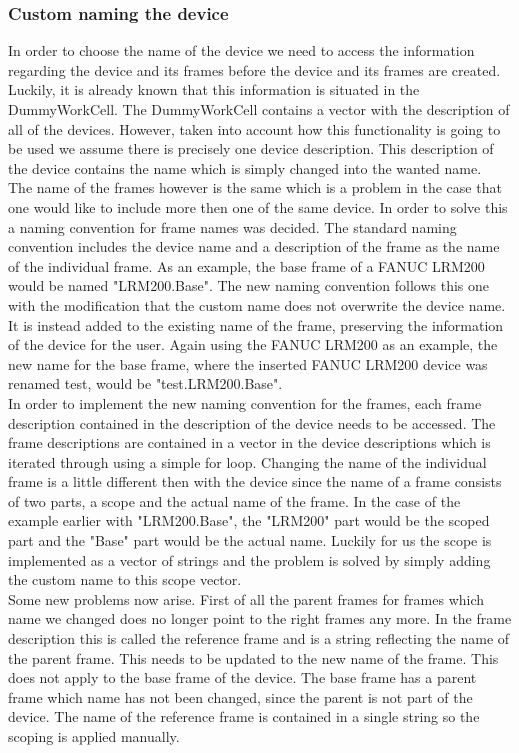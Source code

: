 \subsubsection{Custom naming the device}
In order to choose the name of the device we need to access the information regarding the device and its frames before the device and its frames are created. Luckily, it is already known that this information is situated in the DummyWorkCell. The DummyWorkCell contains a vector with the description of all of the devices. However, taken into account how this functionality is going to be used we assume there is precisely one device description. This description of the device contains the name which is simply changed into the wanted name.\\

The name of the frames however is the same which is a problem in the case that one would like to include more then one of the same device. In order to solve this a naming convention for frame names was decided. The standard naming convention includes the device name and a description of the frame as the name of the individual frame. As an example, the base frame of a FANUC LRM200 would be named "LRM200.Base". The new naming convention follows this one with the modification that the custom name does not overwrite the device name. It is instead added to the existing name of the frame, preserving the information of the device for the user. Again using the FANUC LRM200 as an example, the new name for the base frame, where the inserted FANUC LRM200 device was renamed test, would be "test.LRM200.Base".\\

In order to implement the new naming convention for the frames, each frame description contained in the description of the device needs to be accessed. The frame descriptions are contained in a vector in the device descriptions which is iterated through using a simple for loop. Changing the name of the individual frame is a little different then with the device since the name of a frame consists of two parts, a scope and the actual name of the frame. In the case of the example earlier with "LRM200.Base", the "LRM200" part would be the scoped part and the "Base" part would be the actual name. Luckily for us the scope is implemented as a vector of strings and the problem is solved by simply adding the custom name to this scope vector.\\

Some new problems now arise. First of all the parent frames for frames which name we changed does no longer point to the right frames any more. In the frame description this is called the reference frame and is a string reflecting the name of the parent frame. This needs to be updated to the new name of the frame. This does not apply to the base frame of the device. The base frame has a parent frame which name has not been changed, since the parent is not part of the device. The name of the reference frame is contained in a single string so the scoping is applied manually.\\

